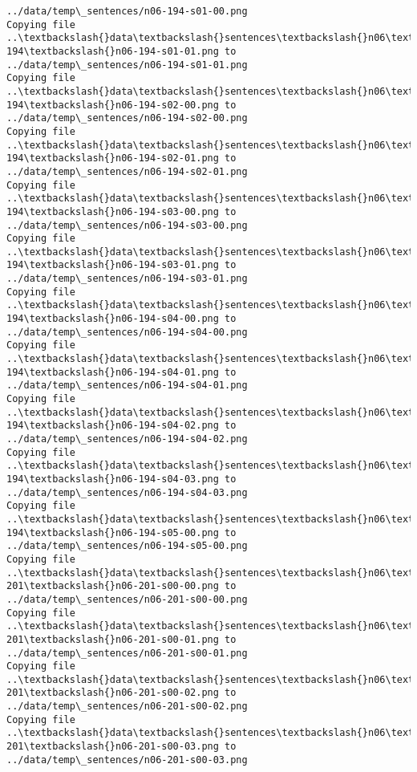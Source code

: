 \documentclass[11pt]{article}
\begin{document}
\begin{Verbatim}[commandchars=\\\{\}]
../data/temp\_sentences/n06-194-s01-00.png
Copying file ..\textbackslash{}data\textbackslash{}sentences\textbackslash{}n06\textbackslash{}n06-194\textbackslash{}n06-194-s01-01.png to
../data/temp\_sentences/n06-194-s01-01.png
Copying file ..\textbackslash{}data\textbackslash{}sentences\textbackslash{}n06\textbackslash{}n06-194\textbackslash{}n06-194-s02-00.png to
../data/temp\_sentences/n06-194-s02-00.png
Copying file ..\textbackslash{}data\textbackslash{}sentences\textbackslash{}n06\textbackslash{}n06-194\textbackslash{}n06-194-s02-01.png to
../data/temp\_sentences/n06-194-s02-01.png
Copying file ..\textbackslash{}data\textbackslash{}sentences\textbackslash{}n06\textbackslash{}n06-194\textbackslash{}n06-194-s03-00.png to
../data/temp\_sentences/n06-194-s03-00.png
Copying file ..\textbackslash{}data\textbackslash{}sentences\textbackslash{}n06\textbackslash{}n06-194\textbackslash{}n06-194-s03-01.png to
../data/temp\_sentences/n06-194-s03-01.png
Copying file ..\textbackslash{}data\textbackslash{}sentences\textbackslash{}n06\textbackslash{}n06-194\textbackslash{}n06-194-s04-00.png to
../data/temp\_sentences/n06-194-s04-00.png
Copying file ..\textbackslash{}data\textbackslash{}sentences\textbackslash{}n06\textbackslash{}n06-194\textbackslash{}n06-194-s04-01.png to
../data/temp\_sentences/n06-194-s04-01.png
Copying file ..\textbackslash{}data\textbackslash{}sentences\textbackslash{}n06\textbackslash{}n06-194\textbackslash{}n06-194-s04-02.png to
../data/temp\_sentences/n06-194-s04-02.png
Copying file ..\textbackslash{}data\textbackslash{}sentences\textbackslash{}n06\textbackslash{}n06-194\textbackslash{}n06-194-s04-03.png to
../data/temp\_sentences/n06-194-s04-03.png
Copying file ..\textbackslash{}data\textbackslash{}sentences\textbackslash{}n06\textbackslash{}n06-194\textbackslash{}n06-194-s05-00.png to
../data/temp\_sentences/n06-194-s05-00.png
Copying file ..\textbackslash{}data\textbackslash{}sentences\textbackslash{}n06\textbackslash{}n06-201\textbackslash{}n06-201-s00-00.png to
../data/temp\_sentences/n06-201-s00-00.png
Copying file ..\textbackslash{}data\textbackslash{}sentences\textbackslash{}n06\textbackslash{}n06-201\textbackslash{}n06-201-s00-01.png to
../data/temp\_sentences/n06-201-s00-01.png
Copying file ..\textbackslash{}data\textbackslash{}sentences\textbackslash{}n06\textbackslash{}n06-201\textbackslash{}n06-201-s00-02.png to
../data/temp\_sentences/n06-201-s00-02.png
Copying file ..\textbackslash{}data\textbackslash{}sentences\textbackslash{}n06\textbackslash{}n06-201\textbackslash{}n06-201-s00-03.png to
../data/temp\_sentences/n06-201-s00-03.png

\end{Verbatim}
\end{document}
